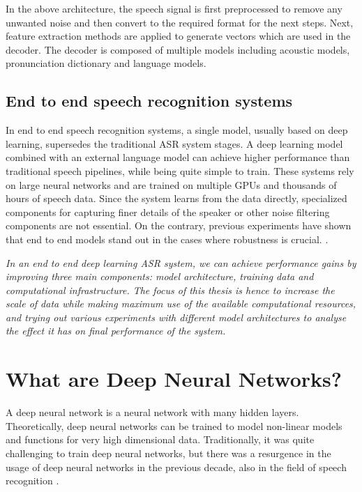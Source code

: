 In the above architecture, the speech signal is first preprocessed to remove any unwanted noise and then convert to the required format for the next steps. Next, feature extraction methods are applied to generate vectors which are used in the decoder. The decoder is composed of multiple models including acoustic models, pronunciation dictionary and language models. 

\subsection{End to end speech recognition systems}
\label{section:e2easr}
In end to end speech recognition systems, a single model, usually based on deep learning, supersedes the traditional ASR system stages. A deep learning model combined with an external language model can achieve higher performance than traditional speech pipelines, while being quite simple to train. These systems rely on large neural networks and are trained on multiple GPUs and thousands of hours of speech data. Since the system learns from the data directly, specialized components for capturing finer details of the speaker or other noise filtering components are not essential. On the contrary, previous experiments have shown that end to end models stand out in the cases where robustness is crucial. \cite{Hannun2014DeepRecognition}. 

\emph{In an end to end deep learning ASR system, we can achieve performance gains by improving three main components: model architecture, training data and computational infrastructure. The focus of this thesis is hence to increase the scale of data while making maximum use of the available computational resources, and trying out various experiments with different model architectures to analyse the effect it has on final performance of the system.}

\section{What are Deep Neural Networks?}
A deep neural network is a neural network with many hidden layers. Theoretically, deep neural networks can be trained to model non-linear models and functions for very high dimensional data. Traditionally, it was quite challenging to train deep neural networks, but there was a resurgence in the usage of deep neural networks in the previous decade, also in the field of speech recognition \cite{Dahl2012Context-DependentRecognition, Morgan2012DeepRecognition, DengRECENTMICROSOFT, Hannun2014DeepRecognition}. 

